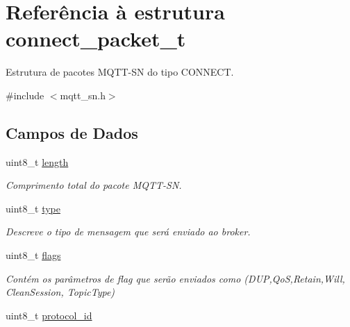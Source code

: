 \hypertarget{structconnect__packet__t}{\section{Referência à estrutura connect\+\_\+packet\+\_\+t}
\label{structconnect__packet__t}
}


Estrutura de pacotes M\+Q\+T\+T-\/\+S\+N do tipo C\+O\+N\+N\+E\+C\+T.  




{\ttfamily \#include $<$mqtt\+\_\+sn.\+h$>$}

\subsection*{Campos de Dados}
\begin{DoxyCompactItemize}
\item 
\hypertarget{structconnect__packet__t_af9d495c1655d813d553030485d00fea7}{uint8\+\_\+t \hyperlink{structconnect__packet__t_af9d495c1655d813d553030485d00fea7}{length}}\label{structconnect__packet__t_af9d495c1655d813d553030485d00fea7}

\begin{DoxyCompactList}\small\item\em Comprimento total do pacote M\+Q\+T\+T-\/\+S\+N. \end{DoxyCompactList}\item 
\hypertarget{structconnect__packet__t_a7aead736a07eaf25623ad7bfa1f0ee2d}{uint8\+\_\+t \hyperlink{structconnect__packet__t_a7aead736a07eaf25623ad7bfa1f0ee2d}{type}}\label{structconnect__packet__t_a7aead736a07eaf25623ad7bfa1f0ee2d}

\begin{DoxyCompactList}\small\item\em Descreve o tipo de mensagem que será enviado ao broker. \end{DoxyCompactList}\item 
\hypertarget{structconnect__packet__t_ab6b306ef981f5e21bb41ea2c2dbe8cd9}{uint8\+\_\+t \hyperlink{structconnect__packet__t_ab6b306ef981f5e21bb41ea2c2dbe8cd9}{flags}}\label{structconnect__packet__t_ab6b306ef981f5e21bb41ea2c2dbe8cd9}

\begin{DoxyCompactList}\small\item\em Contém os parâmetros de flag que serão enviados como (D\+U\+P,Qo\+S,Retain,Will, Clean\+Session, Topic\+Type) \end{DoxyCompactList}\item 
\hypertarget{structconnect__packet__t_ac600161f386567cf3ab274f4afbd5981}{uint8\+\_\+t \hyperlink{structconnect__packet__t_ac600161f386567cf3ab274f4afbd5981}{protocol\+\_\+id}}\label{structconnect__packet__t_ac600161f386567cf3ab274f4afbd5981}


\end{DoxyCompactItemize}
